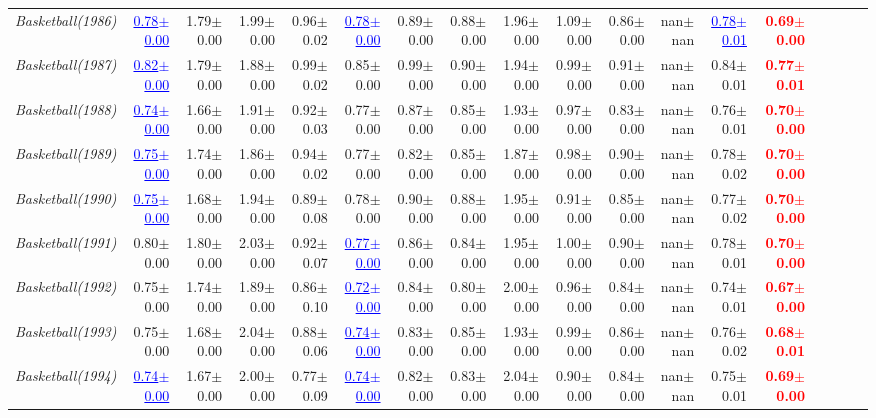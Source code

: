 \documentclass[nohyperref]{article}
\theoremstyle{plain}
\theoremstyle{definition}
\theoremstyle{remark}
\newcommand{\red}[1]{\textcolor{red}{\textbf{#1}}}
\newcommand{\blue}[1]{\textcolor{blue}{\underline{#1}}}
\begin{document}
\begin{table*}[!ht]
{\begin{tabular}{lrrrrrrrrrrrrrrrrr}
			{\it Basketball(1986)} & \blue{0.78$\pm$0.00} & 1.79$\pm$0.00 & 1.99$\pm$0.00 & 0.96$\pm$0.02 & \blue{0.78$\pm$0.00} & 0.89$\pm$0.00 & 0.88$\pm$0.00 & 1.96$\pm$0.00 & 1.09$\pm$0.00 & 0.86$\pm$0.00 & nan$\pm$nan & \blue{0.78$\pm$0.01} & \red{0.69$\pm$0.00} \\
			{\it Basketball(1987)} & \blue{0.82$\pm$0.00} & 1.79$\pm$0.00 & 1.88$\pm$0.00 & 0.99$\pm$0.02 & 0.85$\pm$0.00 & 0.99$\pm$0.00 & 0.90$\pm$0.00 & 1.94$\pm$0.00 & 0.99$\pm$0.00 & 0.91$\pm$0.00 & nan$\pm$nan & 0.84$\pm$0.01 & \red{0.77$\pm$0.01} \\
			{\it Basketball(1988)} & \blue{0.74$\pm$0.00} & 1.66$\pm$0.00 & 1.91$\pm$0.00 & 0.92$\pm$0.03 & 0.77$\pm$0.00 & 0.87$\pm$0.00 & 0.85$\pm$0.00 & 1.93$\pm$0.00 & 0.97$\pm$0.00 & 0.83$\pm$0.00 & nan$\pm$nan & 0.76$\pm$0.01 & \red{0.70$\pm$0.00} \\
			{\it Basketball(1989)} & \blue{0.75$\pm$0.00} & 1.74$\pm$0.00 & 1.86$\pm$0.00 & 0.94$\pm$0.02 & 0.77$\pm$0.00 & 0.82$\pm$0.00 & 0.85$\pm$0.00 & 1.87$\pm$0.00 & 0.98$\pm$0.00 & 0.90$\pm$0.00 & nan$\pm$nan & 0.78$\pm$0.02 & \red{0.70$\pm$0.00} \\
			{\it Basketball(1990)} & \blue{0.75$\pm$0.00} & 1.68$\pm$0.00 & 1.94$\pm$0.00 & 0.89$\pm$0.08 & 0.78$\pm$0.00 & 0.90$\pm$0.00 & 0.88$\pm$0.00 & 1.95$\pm$0.00 & 0.91$\pm$0.00 & 0.85$\pm$0.00 & nan$\pm$nan & 0.77$\pm$0.02 & \red{0.70$\pm$0.00} \\
			{\it Basketball(1991)} & 0.80$\pm$0.00 & 1.80$\pm$0.00 & 2.03$\pm$0.00 & 0.92$\pm$0.07 & \blue{0.77$\pm$0.00} & 0.86$\pm$0.00 & 0.84$\pm$0.00 & 1.95$\pm$0.00 & 1.00$\pm$0.00 & 0.90$\pm$0.00 & nan$\pm$nan & 0.78$\pm$0.01 & \red{0.70$\pm$0.00} \\
			{\it Basketball(1992)} & 0.75$\pm$0.00 & 1.74$\pm$0.00 & 1.89$\pm$0.00 & 0.86$\pm$0.10 & \blue{0.72$\pm$0.00} & 0.84$\pm$0.00 & 0.80$\pm$0.00 & 2.00$\pm$0.00 & 0.96$\pm$0.00 & 0.84$\pm$0.00 & nan$\pm$nan & 0.74$\pm$0.01 & \red{0.67$\pm$0.00} \\
			{\it Basketball(1993)} & 0.75$\pm$0.00 & 1.68$\pm$0.00 & 2.04$\pm$0.00 & 0.88$\pm$0.06 & \blue{0.74$\pm$0.00} & 0.83$\pm$0.00 & 0.85$\pm$0.00 & 1.93$\pm$0.00 & 0.99$\pm$0.00 & 0.86$\pm$0.00 & nan$\pm$nan & 0.76$\pm$0.02 & \red{0.68$\pm$0.01} \\
			{\it Basketball(1994)} & \blue{0.74$\pm$0.00} & 1.67$\pm$0.00 & 2.00$\pm$0.00 & 0.77$\pm$0.09 & \blue{0.74$\pm$0.00} & 0.82$\pm$0.00 & 0.83$\pm$0.00 & 2.04$\pm$0.00 & 0.90$\pm$0.00 & 0.84$\pm$0.00 & nan$\pm$nan & 0.75$\pm$0.01 & \red{0.69$\pm$0.00} \\

\end{tabular}}
\end{table*}
\end{document}
